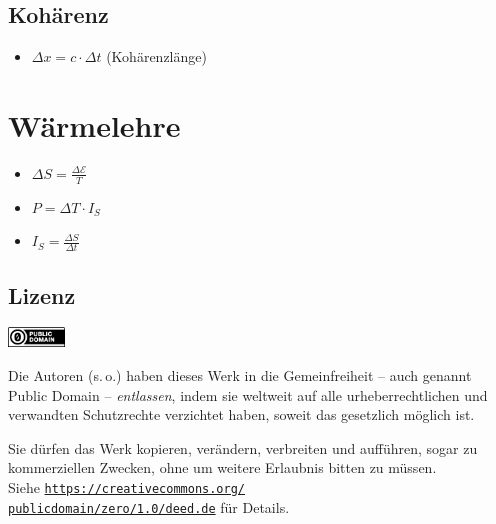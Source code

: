 \documentclass[paper = a4, twocolumn]{scrartcl}
\DeclareRobustCommand{\E}{\mathcal{E}}
\begin{document}
\subsection{Kohärenz}
\begin{itemize}
\item
	\( \Delta x = c \cdot \Delta t \) (Kohärenzlänge)
\end{itemize}

\section{Wärmelehre}
\begin{itemize}
\item
	\( \Delta S = \frac{\Delta \E}{T} \)
\item
	\( P = \Delta T \cdot I_S \)
\item
	\( I_S = \frac{\Delta S}{\Delta t} \)
\end{itemize}

\pagebreak
\begin{appendix}
\section{Lizenz}
\includegraphics[width = 1.5cm]{cc0.png}

Die Autoren (s.\,o.) haben dieses Werk in die Gemeinfreiheit -- auch genannt
Public Domain -- \emph{entlassen}, indem sie weltweit auf alle
urheberrechtlichen und verwandten Schutzrechte verzichtet haben, soweit das
gesetzlich möglich ist.

Sie dürfen das Werk kopieren, verändern, verbreiten und aufführen, sogar zu
kommerziellen Zwecken, ohne um weitere Erlaubnis bitten zu müssen.
\\Siehe \href{https://creativecommons.org/publicdomain/zero/1.0/deed.de}
{\texttt{https://creativecommons.org/\\publicdomain/zero/1.0/deed.de}} für
Details.
\end{appendix}
\end{document}
